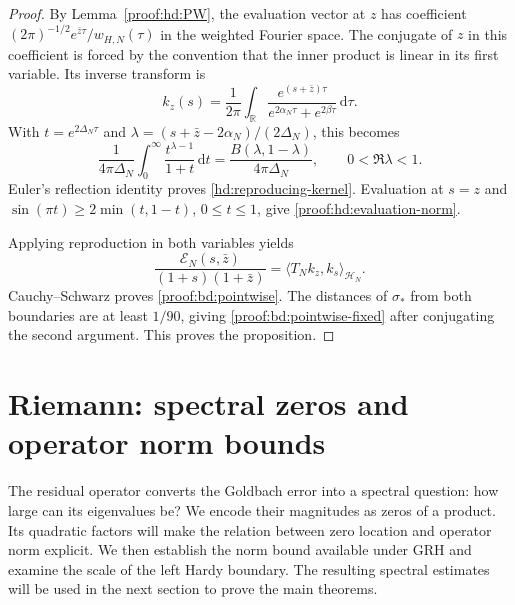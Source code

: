 \documentclass[12pt,a4paper]{amsart}
\numberwithin{equation}{section}
\def\le{\leqslant}
\def\ge{\geqslant}
\theoremstyle{plain}
\theoremstyle{definition}
\theoremstyle{remark}
\begin{document}
\begin{proof}
By Lemma~\ref{proof:hd:PW}, the evaluation vector at $z$ has coefficient
$(2\pi)^{-1/2}e^{\bar z\tau}/w_{H,N}(\tau)$ in the weighted
Fourier space. The conjugate of $z$ in this coefficient is forced by the
convention that the inner product is linear in its first variable. Its inverse transform is
\[
 k_z(s)=\frac1{2\pi}\int_{\mathbb R}
       \frac{e^{(s+\bar z)\tau}}
                  {e^{2\alpha_N\tau}+e^{2\beta\tau}}\,\mathrm{d}\tau.
\]
With $t=e^{2\Delta_N\tau}$ and
$\lambda=(s+\bar z-2\alpha_N)/(2\Delta_N)$, this becomes
\[
 \frac1{4\pi\Delta_N}\int_0^\infty
             \frac{t^{\lambda-1}}{1+t}\,\mathrm{d}t
 =\frac{B(\lambda,1-\lambda)}{4\pi\Delta_N},
 \qquad 0<\Re\lambda<1.
\]
Euler's reflection identity proves \eqref{hd:reproducing-kernel}.
Evaluation at $s=z$ and
$\sin(\pi t)\ge2\min(t,1-t)$, $0\le t\le1$, give
\eqref{proof:hd:evaluation-norm}.

Applying reproduction in both variables yields
\[
 \frac{\mathscr E_N(s,\bar z)}{(1+s)(1+\bar z)}
      =\langle T_Nk_z,k_s\rangle_{\mathcal H_N}.
\]
Cauchy--Schwarz proves \eqref{proof:bd:pointwise}. The distances of
$\sigma_*$ from both boundaries are at least $1/90$, giving
\eqref{proof:bd:pointwise-fixed} after conjugating the second argument.
This proves the proposition.
\end{proof}

\section{Riemann: spectral zeros and operator norm bounds}
\label{proof:sec:spectral-analysis}\label{proof:v7:riemann}

The residual operator converts the Goldbach error into a spectral
question: how large can its eigenvalues be? We encode their magnitudes
as zeros of a product. Its quadratic factors will make the relation
between zero location and operator norm explicit. We then establish
the norm bound available under GRH and examine the scale of the left
Hardy boundary. The resulting spectral estimates will be used in
the next section to prove the main theorems.
\end{document}
